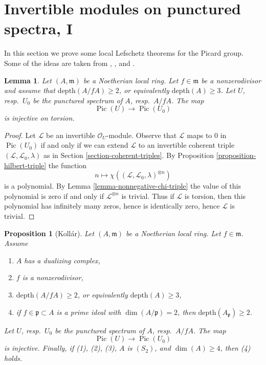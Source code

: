 \documentclass{stacks-project}
\newenvironment{reference}{\comment}{\endcomment}
\theoremstyle{plain}
\newtheorem{proposition}[subsection]{Proposition}
\newtheorem{lemma}[subsection]{Lemma}
\theoremstyle{definition}
\theoremstyle{remark}
\numberwithin{equation}{subsection}
\def\Pic{\mathop{\mathrm{Pic}}\nolimits}
\begin{document}
\section{Invertible modules on punctured spectra, I}
\label{section-local-lefschetz-for-pic}

\noindent
In this section we prove some local Lefschetz theorems for the Picard group.
Some of the ideas are taken from
\cite{Kollar-pic}, \cite{Bhatt-local}, and \cite{Kollar-map-pic}.

\begin{lemma}
\label{lemma-injective-torsion-in-pic}
Let $(A, \mathfrak m)$ be a Noetherian local ring. Let $f \in \mathfrak m$
be a nonzerodivisor and assume that $\text{depth}(A/fA) \geq 2$, or equivalently
$\text{depth}(A) \geq 3$. Let $U$, resp.\ $U_0$ be the punctured
spectrum of $A$, resp.\ $A/fA$. The map
$$
\Pic(U) \to \Pic(U_0)
$$
is injective on torsion.
\end{lemma}

\begin{proof}
Let $\mathcal{L}$ be an invertible $\mathcal{O}_U$-module.
Observe that $\mathcal{L}$ maps to $0$ in $\Pic(U_0)$
if and only if we can extend $\mathcal{L}$ to an invertible
coherent triple $(\mathcal{L}, \mathcal{L}_0, \lambda)$
as in Section \ref{section-coherent-triples}.
By Proposition \ref{proposition-hilbert-triple}
the function
$$
n \longmapsto \chi((\mathcal{L}, \mathcal{L}_0, \lambda)^{\otimes n})
$$
is a polynomial. By Lemma \ref{lemma-nonnegative-chi-triple}
the value of this polynomial is zero if and only if
$\mathcal{L}^{\otimes n}$ is trivial.
Thus if $\mathcal{L}$ is torsion, then this
polynomial has infinitely many zeros, hence is
identically zero, hence $\mathcal{L}$ is trivial.
\end{proof}

\begin{proposition}[Koll\'ar]
\label{proposition-injective-pic}
\begin{reference}
\cite[Theorem 1.9]{Kollar-map-pic}
\end{reference}
Let $(A, \mathfrak m)$ be a Noetherian local ring. Let $f \in \mathfrak m$.
Assume
\begin{enumerate}
\item $A$ has a dualizing complex,
\item $f$ is a nonzerodivisor,
\item $\text{depth}(A/fA) \geq 2$, or equivalently $\text{depth}(A) \geq 3$,
\item if $f \in \mathfrak p \subset A$ is a prime ideal with
$\dim(A/\mathfrak p) = 2$, then $\text{depth}(A_\mathfrak p) \geq 2$.
\end{enumerate}
Let $U$, resp.\ $U_0$ be the punctured spectrum of $A$, resp.\ $A/fA$. The map
$$
\Pic(U) \to \Pic(U_0)
$$
is injective. Finally, if (1), (2), (3), $A$ is $(S_2)$, and
$\dim(A) \geq 4$, then (4) holds.
\end{proposition}
\end{document}
